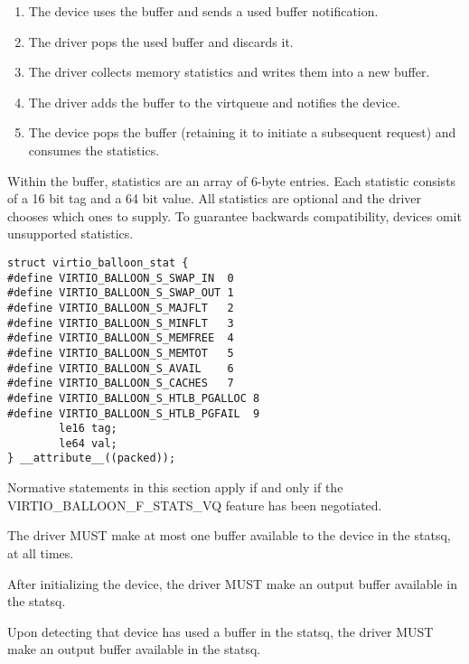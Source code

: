 \begin{enumerate}
\item The device uses the buffer and sends a used buffer notification.

\item The driver pops the used buffer and discards it.

\item The driver collects memory statistics and writes them into a
  new buffer.

\item The driver adds the buffer to the virtqueue and notifies the
  device.

\item The device pops the buffer (retaining it to initiate a
  subsequent request) and consumes the statistics.
\end{enumerate}

  Within the buffer, statistics are an array of 6-byte entries.
  Each statistic consists of a 16 bit
  tag and a 64 bit value. All statistics are optional and the
  driver chooses which ones to supply. To guarantee backwards
  compatibility, devices omit unsupported statistics.

\begin{lstlisting}
struct virtio_balloon_stat {
#define VIRTIO_BALLOON_S_SWAP_IN  0
#define VIRTIO_BALLOON_S_SWAP_OUT 1
#define VIRTIO_BALLOON_S_MAJFLT   2
#define VIRTIO_BALLOON_S_MINFLT   3
#define VIRTIO_BALLOON_S_MEMFREE  4
#define VIRTIO_BALLOON_S_MEMTOT   5
#define VIRTIO_BALLOON_S_AVAIL    6
#define VIRTIO_BALLOON_S_CACHES   7
#define VIRTIO_BALLOON_S_HTLB_PGALLOC 8
#define VIRTIO_BALLOON_S_HTLB_PGFAIL  9
        le16 tag;
        le64 val;
} __attribute__((packed));
\end{lstlisting}

Normative statements in this section apply if and only if the
VIRTIO_BALLOON_F_STATS_VQ feature has been negotiated.

The driver MUST make at most one buffer available to the device
in the statsq, at all times.

After initializing the device, the driver MUST make an output
buffer available in the statsq.

Upon detecting that device has used a buffer in the statsq, the
driver MUST make an output buffer available in the statsq.

